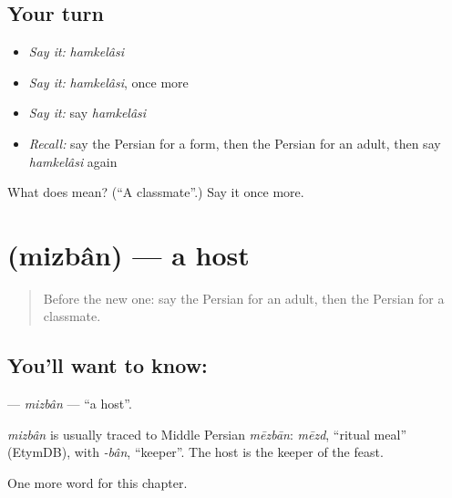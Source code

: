 \subsection*{Your turn}
\begin{itemize}
\raggedright
  \item \emph{Say it:} \emph{hamkelâsi}
  \item \emph{Say it:} \emph{hamkelâsi}, once more
  \item \emph{Say it:} say \emph{hamkelâsi}
  \item \emph{Recall:} say the Persian for a form, then the Persian for an adult, then say \emph{hamkelâsi} again
\end{itemize}

\begin{tcolorbox}[breakable,colback=teal!4,colframe=teal!35!black,title={Before you move on}]
What does  mean? (\textquotedblleft{}A classmate\textquotedblright{}.) Say it once more.
\end{tcolorbox}
\section[\texorpdfstring{\fa{میزبان} (mizbân)}{میزبان (mizbân)}]{ (mizbân) — a host}

\label{lesson:FA-C169-mizban}



\begin{quote}
Before the new one: say the Persian for an adult, then the Persian for a classmate.
\end{quote}

\subsection*{You'll want to know: }
\textbf{} — \emph{mizbân} — \textquotedblleft{}a host\textquotedblright{}.

\begin{cousinweb}
\emph{mizbân} is usually traced to Middle Persian \emph{mēzbān}: \emph{mēzd}, \textquotedblleft{}ritual meal\textquotedblright{} (EtymDB), with \emph{-bân}, \textquotedblleft{}keeper\textquotedblright{}. The host is the keeper of the feast.
\end{cousinweb}

\begin{grammarlens}[title={What you've built}]
One more word for this chapter.
\end{grammarlens}

